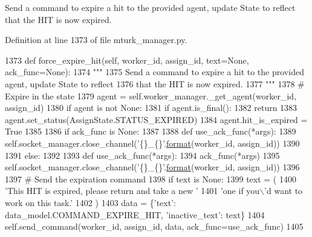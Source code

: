 \begin{DoxyVerb}Send a command to expire a hit to the provided agent, update State to reflect
that the HIT is now expired.
\end{DoxyVerb}
 

Definition at line 1373 of file mturk\+\_\+manager.\+py.


\begin{DoxyCode}
1373     \textcolor{keyword}{def }force\_expire\_hit(self, worker\_id, assign\_id, text=None, ack\_func=None):
1374         \textcolor{stringliteral}{"""}
1375 \textcolor{stringliteral}{        Send a command to expire a hit to the provided agent, update State to reflect}
1376 \textcolor{stringliteral}{        that the HIT is now expired.}
1377 \textcolor{stringliteral}{        """}
1378         \textcolor{comment}{# Expire in the state}
1379         agent = self.worker\_manager.\_get\_agent(worker\_id, assign\_id)
1380         \textcolor{keywordflow}{if} agent \textcolor{keywordflow}{is} \textcolor{keywordflow}{not} \textcolor{keywordtype}{None}:
1381             \textcolor{keywordflow}{if} agent.is\_final():
1382                 \textcolor{keywordflow}{return}
1383             agent.set\_status(AssignState.STATUS\_EXPIRED)
1384             agent.hit\_is\_expired = \textcolor{keyword}{True}
1385 
1386         \textcolor{keywordflow}{if} ack\_func \textcolor{keywordflow}{is} \textcolor{keywordtype}{None}:
1387 
1388             \textcolor{keyword}{def }use\_ack\_func(*args):
1389                 self.socket\_manager.close\_channel(\textcolor{stringliteral}{'\{\}\_\{\}'}.\hyperlink{namespaceparlai_1_1chat__service_1_1services_1_1messenger_1_1shared__utils_a32e2e2022b824fbaf80c747160b52a76}{format}(worker\_id, assign\_id))
1390 
1391         \textcolor{keywordflow}{else}:
1392 
1393             \textcolor{keyword}{def }use\_ack\_func(*args):
1394                 ack\_func(*args)
1395                 self.socket\_manager.close\_channel(\textcolor{stringliteral}{'\{\}\_\{\}'}.\hyperlink{namespaceparlai_1_1chat__service_1_1services_1_1messenger_1_1shared__utils_a32e2e2022b824fbaf80c747160b52a76}{format}(worker\_id, assign\_id))
1396 
1397         \textcolor{comment}{# Send the expiration command}
1398         \textcolor{keywordflow}{if} text \textcolor{keywordflow}{is} \textcolor{keywordtype}{None}:
1399             text = (
1400                 \textcolor{stringliteral}{'This HIT is expired, please return and take a new '}
1401                 \textcolor{stringliteral}{'one if you\(\backslash\)'d want to work on this task.'}
1402             )
1403         data = \{\textcolor{stringliteral}{'text'}: data\_model.COMMAND\_EXPIRE\_HIT, \textcolor{stringliteral}{'inactive\_text'}: text\}
1404         self.send\_command(worker\_id, assign\_id, data, ack\_func=use\_ack\_func)
1405 
\end{DoxyCode}
